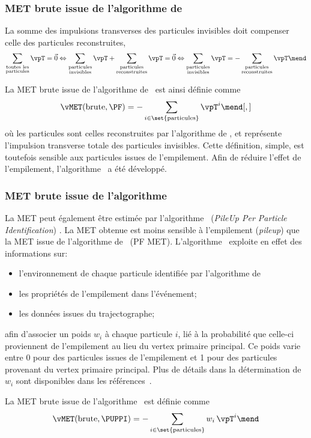 \subsubsection{MET brute issue de l'algorithme de \PF}
La somme des impulsions transverses des particules invisibles doit compenser celle des particules reconstruites, \ie
\begin{equation}
\sum_{\substack{\text{toutes les}\\\text{particules}}} \vpT = \vec{0}
\Leftrightarrow
\sum_{\substack{\text{particules}\\\text{invisibles}}} \vpT + \sum_{\substack{\text{particules}\\\text{reconstruites}}} \vpT = \vec{0}
\Leftrightarrow
\sum_{\substack{\text{particules}\\\text{invisibles}}} \vpT = -\sum_{\substack{\text{particules}\\\text{reconstruites}}} \vpT \mend
\end{equation}
\par La MET brute issue de l'algorithme de \PF\ est ainsi définie comme
\begin{equation}
\vMET(\text{brute}, \text{\PF}) = -\sum_{i\in\set{\text{particules}}} \vpT^{i}
\mend[,]
\end{equation}
où les particules sont celles reconstruites par l'algorithme de \PF,
et représente l'impulsion transverse totale des particules invisibles.
Cette définition, simple, est toutefois sensible aux particules issues de l'empilement.
Afin de réduire l'effet de l'empilement, l'algorithme \PUPPI\ a été développé.
\subsubsection{MET brute issue de l'algorithme \PUPPI}
La MET peut également être estimée par l'algorithme \PUPPI\ (\emph{PileUp Per Particle Identification}) \cite{PUPPI}.
La \og \PUPPI MET \fg{} obtenue est moins sensible à l'empilement (\emph{pileup}) que la MET issue de l'algorithme de \PF\ (PF MET).
L'algorithme \PUPPI\ exploite en effet des informations sur:
\begin{itemize}
\item l'environnement de chaque particule identifiée par l'algorithme de \PF\;
\item les propriétés de l'empilement dans l'événement;
\item les données issues du trajectographe;
\end{itemize}
afin d'associer un poids $w_i$ à chaque particule $i$, lié à la probabilité que celle-ci proviennent de l'empilement au lieu du vertex primaire principal.
Ce poids varie entre
\num{0} pour des particules issues de l'empilement
et
\num{1} pour des particules provenant du vertex primaire principal.
Plus de détails dans la détermination de $w_i$ sont disponibles dans les références~\cite{CMS-PAS-JME-17-001,PUPPI}.
\par La MET brute issue de l'algorithme \PUPPI\ est définie comme
\begin{equation}
\vMET(\text{brute}, \text{\PUPPI}) = -\sum_{i\in\set{\text{particules}}} w_i\,\vpT^{i}
\mend
\end{equation}
